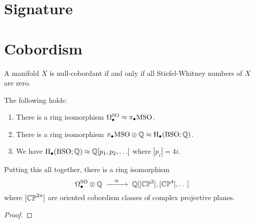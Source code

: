 \section{Signature}\label{sec:signature}

\section{Cobordism}\label{sec:cobordism}

\begin{proposition}\label{prop:characteristic_numbers_cobordism_invariant}
\end{proposition}

\begin{theorem}\label{thm:vanishing_stiefel_whitney}
  A manifold $X$ is null-cobordant if and only if all Stiefel-Whitney numbers of $X$ are zero.
\end{theorem}

\begin{theorem}\label{thm:thom-pontryagin_oriented_cobordism}
  The following holds:
  \begin{enumerate}
    \item There is a ring isomorphism $\Omega^{\operatorname{SO}}_\bullet \approx \pi_\bullet {\operatorname{MSO}}$.
    \item There is a ring isomorphism $\pi_\bullet{\operatorname{MSO}} \otimes \mathbb{Q} \approx \operatorname{H}_\bullet({\operatorname{BSO}}; \mathbb{Q})$.
    \item We have $\operatorname{H}_\bullet({\operatorname{BSO}}; \mathbb{Q}) \approx \mathbb{Q}[p_1, p_2,\ldots]$ where $|p_i|=4i$.
  \end{enumerate}
  Putting this all together, there is a ring isomorphism
  \[
    \Omega^\SO_\bullet\otimes \Q \lkxto[\cong] \Q[[\CP^2], [\CP^4],\ldots]
  \]
  where $[\mathbb{CP}^{2n}]$ are oriented cobordism classes of complex projective planes.
\end{theorem}
\begin{proof}
\end{proof}
